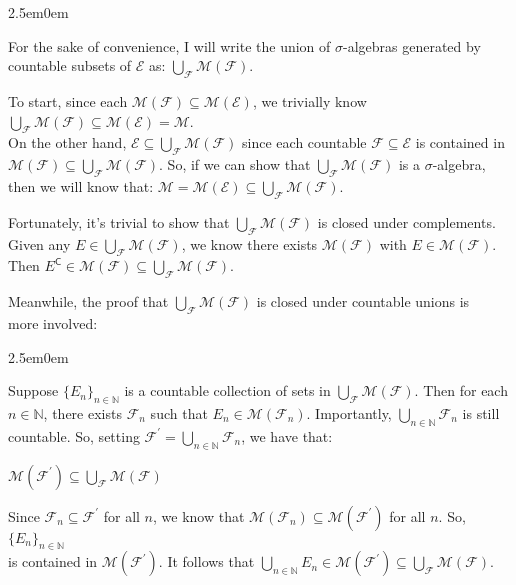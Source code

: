 \documentclass{book}
\newcommand{\exTwoP}{%
   \color{RedViolet}%
   \fontsize{13}{15}\selectfont%
}
\newcommand{\exPPP}{%
   \color{VioletRed}%
   \fontsize{12}{14}\selectfont%
}
\newenvironment{myIndent}{%
   \begin{adjustwidth}{2.5em}{0em}%
}{%
   \end{adjustwidth}%
}
\newcommand{\comp}{\mathsf{C}}
\newcommand{\retTwo}{\hfill\bigbreak}
\begin{document}
\begin{myIndent}\exTwoP
   For the sake of convenience, I will write the union of $\sigma$-algebras generated by\\ countable subsets of $\mathcal{E}$ as: $\bigcup_\mathcal{F} \mathcal{M}(\mathcal{F})$.\retTwo

   To start, since each $\mathcal{M}(\mathcal{F}) \subseteq \mathcal{M}(\mathcal{E})$, we trivially know $\bigcup_\mathcal{F}\mathcal{M}(\mathcal{F}) \subseteq \mathcal{M}(\mathcal{E}) = \mathcal{M}$.\\ On the other hand, $\mathcal{E} \subseteq \bigcup_\mathcal{F}\mathcal{M}(\mathcal{F})$ since each countable $\mathcal{F} \subseteq \mathcal{E}$ is contained in\\ $\mathcal{M}(\mathcal{F}) \subseteq \bigcup_\mathcal{F}\mathcal{M}(\mathcal{F})$. So, if we can show that $\bigcup_\mathcal{F}\mathcal{M}(\mathcal{F})$ is a $\sigma$-algebra, then we will know that: $\mathcal{M} = \mathcal{M}(\mathcal{E}) \subseteq \bigcup_\mathcal{F}\mathcal{M}(\mathcal{F})$.\retTwo

   Fortunately, it's trivial to show that $\bigcup_\mathcal{F}\mathcal{M}(\mathcal{F})$ is closed under complements.\\ Given any $E \in \bigcup_\mathcal{F}\mathcal{M}(\mathcal{F})$, we know there exists $\mathcal{M}(\mathcal{F})$ with $E \in \mathcal{M}(\mathcal{F})$.\\ Then $E^\comp \in \mathcal{M}(\mathcal{F}) \subseteq \bigcup_\mathcal{F}\mathcal{M}(\mathcal{F})$. \retTwo
   
   Meanwhile, the proof that $\bigcup_\mathcal{F}\mathcal{M}(\mathcal{F})$ is closed under countable unions is\\ more involved:\\ [-9pt]
   \begin{myIndent}\exPPP
      Suppose $\{E_n\}_{n \in \mathbb{N}}$ is a countable collection of sets in $\bigcup_\mathcal{F}\mathcal{M}(\mathcal{F})$. Then for each\\ $n \in \mathbb{N}$, there exists $\mathcal{F}_n$ such that $E_n \in \mathcal{M}(\mathcal{F}_n)$. Importantly, $\bigcup\limits_{n \in \mathbb{N}}\mathcal{F}_n$ is still\\ [-7pt] countable. So, setting $\mathcal{F}^\prime = \bigcup\limits_{n \in \mathbb{N}}\mathcal{F}_n$, we have that:

      {\centering $\mathcal{M}(\mathcal{F}^\prime) \subseteq \bigcup_\mathcal{F}\mathcal{M}(\mathcal{F})$ \retTwo\par}

      Since $\mathcal{F}_n \subseteq \mathcal{F}^\prime$ for all $n$, we know that $\mathcal{M}(\mathcal{F}_n) \subseteq \mathcal{M}(\mathcal{F}^\prime)$ for all $n$. So, $\{E_n\}_{n \in \mathbb{N}}$\\ is contained in $\mathcal{M}(\mathcal{F}^\prime)$. It follows that $\bigcup\limits_{n \in \mathbb{N}}E_n \in \mathcal{M}(\mathcal{F}^\prime) \subseteq \bigcup_\mathcal{F}\mathcal{M}(\mathcal{F})$.\retTwo
   \end{myIndent}
\end{myIndent}
\end{document}
